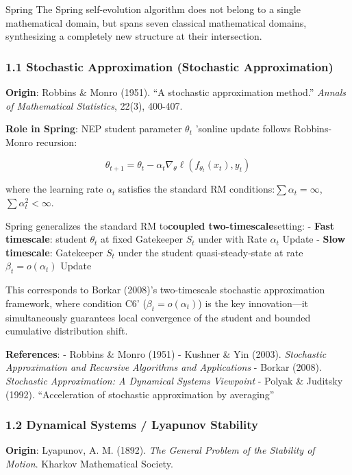 \documentclass[
  12pt,
]{article}
\begin{document}
Spring
The Spring self-evolution algorithm does not belong to a single mathematical domain, but spans seven classical mathematical domains, synthesizing a completely new structure at their intersection.

\subsubsection{1.1 Stochastic Approximation (Stochastic
Approximation)}\label{ux968fux673aux903cux8fd1-stochastic-approximation}

\textbf{Origin}: Robbins \& Monro (1951). ``A stochastic approximation
method.'' \emph{Annals of Mathematical Statistics}, 22(3), 400-407.

\textbf{Role in Spring}: NEP student parameter \(\theta_t\) 'sonline update follows
Robbins-Monro recursion:

\[\theta_{t+1} = \theta_t - \alpha_t \nabla_\theta \ell(f_{\theta_t}(x_t), y_t)\]

where the learning rate \(\alpha_t\) satisfies the standard RM
conditions:\(\sum \alpha_t = \infty\), \(\sum \alpha_t^2 < \infty\). 

Spring generalizes the standard RM to\textbf{coupled two-timescale}setting:  -
\textbf{Fast timescale}: student  \(\theta_t\) at fixed  Gatekeeper \(S_t\)
under with Rate \(\alpha_t\) Update - \textbf{Slow timescale}: Gatekeeper \(S_t\)
under the student quasi-steady-state at rate \(\beta_t = o(\alpha_t)\) Update

This corresponds to Borkar (2008)'s two-timescale stochastic approximation framework, where condition C6'
(\(\beta_t = o(\alpha_t)\))
is the key innovation---it simultaneously guarantees local convergence of the student and bounded cumulative distribution shift.

\textbf{References}: - Robbins \& Monro (1951) - Kushner \& Yin (2003).
\emph{Stochastic Approximation and Recursive Algorithms and
Applications} - Borkar (2008). \emph{Stochastic Approximation: A
Dynamical Systems Viewpoint} - Polyak \& Juditsky (1992). ``Acceleration
of stochastic approximation by averaging''

\subsubsection{1.2 Dynamical Systems / Lyapunov
Stability}\label{ux52a8ux529bux7cfbux7edf-lyapunov-ux7a33ux5b9aux6027}

\textbf{Origin}: Lyapunov, A. M. (1892). \emph{The General Problem of the
Stability of Motion}. Kharkov Mathematical Society.
\end{document}
